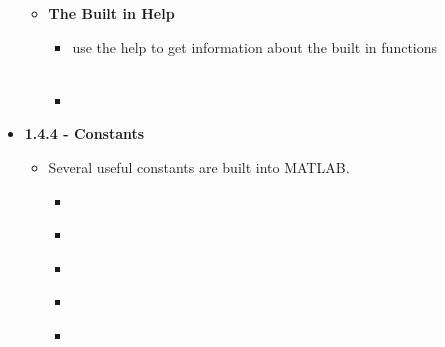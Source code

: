 \documentclass[11pt]{article}
\begin{document}
\begin{itemize}
\begin{itemize}
\begin{itemize}
				\end{itemize}	
			\item \textbf{\Large The Built in Help }\\	
				\begin{itemize}
					\item \LARGE{use the help to get information about the built in functions } \\\\
					\item {} \\
	
				\end{itemize}	
				\newpage


	
		\end{itemize}






	\newpage
	\item \textbf{ \LARGE 1.4.4 - Constants} \\
		\begin{itemize}
			\item \LARGE{Several useful constants are built into MATLAB.} \\

				\begin{itemize}
					
					\item {} \\
					\item {} \\
					\item {} \\
					\item {} \\
					\item {} \\\\

				\end{itemize}




\end{itemize}
\end{itemize}
\end{document}
